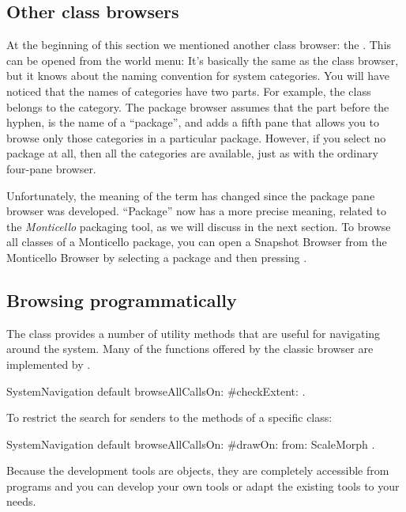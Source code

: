 \documentclass[a4paper,10pt,twoside]{book}
\begin{document}

\subsection{Other class browsers}
\label{sec:otherBrowsers}

At the beginning of this section we mentioned another class browser: the . 
This can be opened from the world menu: 
It's basically the same as the class browser, but it knows about the naming convention for system categories.
You will have noticed that the names of categories have two parts.
For example, the  class belongs to the  category.
\label{sec:package-names}
The package browser assumes that the part before the hyphen,  is the name of a ``package'', and adds a fifth pane that allows you to browse only those categories in a particular package.
However, if you select no package at all, then all the categories are available, just as with the ordinary four-pane browser.

Unfortunately, the meaning of the term  has changed since the package pane browser was developed.  ``Package'' now has a more precise meaning, related to the \emph{Monticello} packaging tool, as we will discuss in the next section.  To browse all classes of a Monticello package, you can open a Snapshot Browser from the Monticello Browser by selecting a package and then pressing .

\subsection{Browsing programmatically}

The class  provides a number of utility methods that are useful for navigating around the system.
Many of the functions offered by the classic browser are implemented by .

\begin{code}{}
SystemNavigation default browseAllCallsOn: #checkExtent: .
\end{code}
To restrict the search for senders to the methods of a specific class:
\begin{code}{}
SystemNavigation default browseAllCallsOn: #drawOn: from: ScaleMorph .
\end{code}
Because the development tools are objects, they are completely accessible from programs and you can develop your own tools or adapt the existing tools to your needs.
\end{document}
